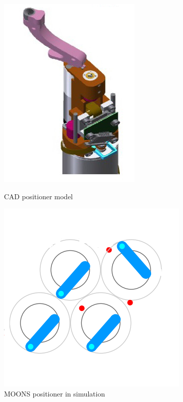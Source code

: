 \documentclass[]{spie}  %
\begin{document}
	\begin{figure}[H]
		\hspace{2cm}
		\begin{minipage}[t]{4.5cm}
			\includegraphics[scale=0.3]{images/realPositioner.jpg}
			\caption{CAD positioner model}
			\label{MOONS_positioner_representation}
		\end{minipage}
		\begin{minipage}[t]{5cm}
			\includegraphics[scale=0.56]{images/MOONSPositioner_Simulation.png}
			\caption{MOONS positioner in simulation}
			\label{MOONS_positioner_simulation}
		\end{minipage}
		\begin{minipage}[t]{5cm}

\end{minipage}
\end{figure}
\end{document}

